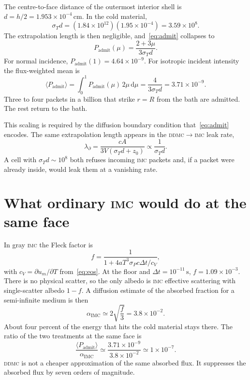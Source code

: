 \documentclass[11pt]{article}
\newcommand{\imc}{\textsc{imc}}
\newcommand{\ddmc}{\textsc{ddmc}}
\begin{document}
The centre-to-face distance of the outermost interior shell is $d=h/2=1.953\times 10^{-4}\,\mathrm{cm}$.
In the cold material,
\begin{equation}
  \sigma_T d = (1.84\times 10^{12})(1.95\times 10^{-4}) = 3.59\times 10^{8}.
\end{equation}
The extrapolation length is then negligible, and~\eqref{eq:admit} collapses to
\begin{equation}
  P_{\mathrm{admit}}(\mu)
  =
  \frac{2+3\mu}{3\sigma_T d}.
  \label{eq:admit-thick}
\end{equation}
For normal incidence, $P_{\mathrm{admit}}(1)=4.64\times 10^{-9}$.
For isotropic incident intensity the flux-weighted mean is
\begin{equation}
  \langle P_{\mathrm{admit}}\rangle
  =
  \int_{0}^{1} P_{\mathrm{admit}}(\mu)\, 2\mu\,\mathrm{d}\mu
  =
  \frac{4}{3\sigma_T d}
  =
  3.71\times 10^{-9}.
  \label{eq:admit-mean}
\end{equation}
Three to four packets in a billion that strike $r=R$ from the bath are admitted.
The rest return to the bath.

This scaling is required by the diffusion boundary condition that~\eqref{eq:admit} encodes.
The same extrapolation length appears in the \ddmc$\to$\imc{} leak rate,
\begin{equation}
  \lambda_{\partial}
  =
  \frac{cA}{3V(\sigma_T d + z_0)}
  \propto
  \frac{1}{\sigma_T d}.
  \label{eq:leak}
\end{equation}
A cell with $\sigma_T d\sim 10^{8}$ both refuses incoming \imc{} packets and, if a packet were already inside, would leak them at a vanishing rate.

\section{What ordinary \imc{} would do at the same face}

In gray \imc{} the Fleck factor is
\begin{equation}
  f
  =
  \frac{1}{1 + 4aT^{3}\sigma_P c\Delta t / c_V},
  \label{eq:fleck}
\end{equation}
with $c_V=\partial u_m/\partial T$ from~\eqref{eq:eos}.
At the floor and $\Delta t=10^{-11}\,\mathrm{s}$, $f=1.09\times 10^{-3}$.
There is no physical scatter, so the only albedo is \imc{} effective scattering with single-scatter albedo $1-f$.
A diffusion estimate of the absorbed fraction for a semi-infinite medium is then
\begin{equation}
  \alpha_{\mathrm{IMC}}
  \simeq
  2\sqrt{\frac{f}{3}}
  =
  3.8\times 10^{-2}.
  \label{eq:imc-abs}
\end{equation}
About four percent of the energy that hits the cold material stays there.
The ratio of the two treatments at the same face is
\begin{equation}
  \frac{\langle P_{\mathrm{admit}}\rangle}{\alpha_{\mathrm{IMC}}}
  \simeq
  \frac{3.71\times 10^{-9}}{3.8\times 10^{-2}}
  \simeq
  1\times 10^{-7}.
  \label{eq:ratio}
\end{equation}
\ddmc{} is not a cheaper approximation of the same absorbed flux.
It suppresses the absorbed flux by seven orders of magnitude.
\end{document}
